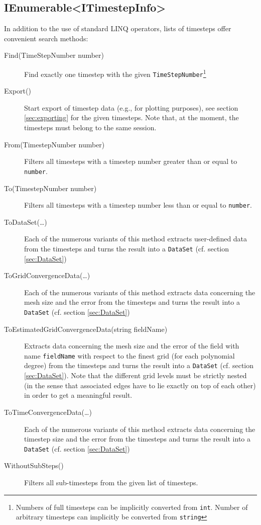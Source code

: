 \subsection{IEnumerable<ITimestepInfo>}
In addition to the use of standard LINQ operators, lists of timesteps offer convenient search methods:
\begin{description}
	\item[Find(TimeStepNumber number)]
	Find exactly one timestep with the given \lstinline{TimeStepNumber}\footnote{Numbers of full timesteps can be implicitly converted from \lstinline{int}. Number of arbitrary timesteps can implicitly be converted from \lstinline{string}}
	
	\item[Export()]
	Start export of timestep data (e.g., for plotting purposes), see section \ref{sec:exporting} for the given timesteps. Note that, at the moment, the timesteps must belong to the same session.
	
	\item[From(TimestepNumber number)]
	Filters all timesteps with a timestep number greater than or equal to \lstinline{number}.
	
	\item[To(TimestepNumber number)]
	Filters all timesteps with a timestep number less than or equal to \lstinline{number}.
	
	\item[ToDataSet(\ldots)]
	Each of the numerous variants of this method extracts user-defined data from the timesteps and turns the result into a \lstinline{DataSet} (cf. section \ref{sec:DataSet})
	
	\item[ToGridConvergenceData(\ldots)]
	Each of the numerous variants of this method extracts data concerning the mesh size and the error from the timesteps and turns the result into a \lstinline{DataSet} (cf. section \ref{sec:DataSet})
	
	\item[ToEstimatedGridConvergenceData(string fieldName)]
	Extracts data concerning the mesh size and the error of the field with name \lstinline{fieldName} with respect to the finest grid (for each polynomial degree) from the timesteps and turns the result into a \lstinline{DataSet} (cf. section \ref{sec:DataSet}). Note that the different grid levels must be strictly nested (in the sense that associated edges have to lie exactly on top of each other) in order to get a meaningful result.
	
	\item[ToTimeConvergenceData(\ldots)]
	Each of the numerous variants of this method extracts data concerning the timestep size and the error from the timesteps and turns the result into a \lstinline{DataSet} (cf. section \ref{sec:DataSet})
	
	\item[WithoutSubSteps()]
	Filters all sub-timesteps from the given list of timesteps.
\end{description}

